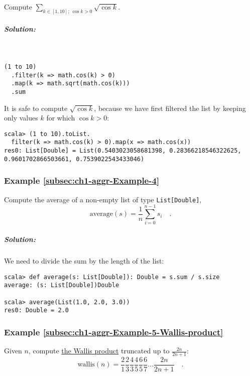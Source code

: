 Compute $\sum_{k\in[1,10];~\cos k>0}\sqrt{\cos k}$.

\subparagraph{Solution:}

~

\begin{lstlisting}
(1 to 10)
  .filter(k => math.cos(k) > 0)
  .map(k => math.sqrt(math.cos(k)))
  .sum
\end{lstlisting}
It is safe to compute $\sqrt{\cos k}$, because we have first filtered
the list by keeping only values $k$ for which $\cos k>0$:
\begin{lstlisting}
scala> (1 to 10).toList.
  filter(k => math.cos(k) > 0).map(x => math.cos(x))
res0: List[Double] = List(0.5403023058681398, 0.28366218546322625, 0.9601702866503661, 0.7539022543433046)
\end{lstlisting}

\subsubsection{Example \label{subsec:ch1-aggr-Example-4}\ref{subsec:ch1-aggr-Example-4}}

Compute the average of a non-empty list of type \lstinline!List[Double]!,
\[
\text{average}\left(s\right)=\frac{1}{n}\sum_{i=0}^{n-1}s_{i}\quad.
\]


\subparagraph{Solution:}

We need to divide the sum by the length of the list:
\begin{lstlisting}
scala> def average(s: List[Double]): Double = s.sum / s.size
average: (s: List[Double])Double

scala> average(List(1.0, 2.0, 3.0))
res0: Double = 2.0
\end{lstlisting}

\subsubsection{Example \label{subsec:ch1-aggr-Example-5-Wallis-product}\ref{subsec:ch1-aggr-Example-5-Wallis-product}}

Given $n$, compute \href{https://en.wikipedia.org/wiki/Wallis_product}{the Wallis product}
truncated up to $\frac{2n}{2n+1}$: 
\[
\text{wallis}\left(n\right)=\frac{2}{1}\frac{2}{3}\frac{4}{3}\frac{4}{5}\frac{6}{5}\frac{6}{7}...\frac{2n}{2n+1}\quad.
\]


